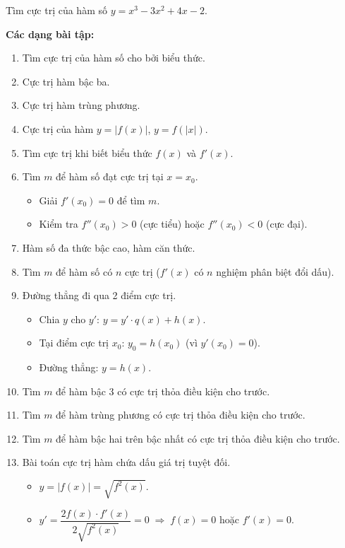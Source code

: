 \documentclass[12pt,a4paper]{article}
\begin{document}
\begin{vidu}
  Tìm cực trị của hàm số $y = x^3 - 3x^2 + 4x - 2$.
\end{vidu}

\medskip\noindent\textbf{Các dạng bài tập:}
\begin{enumerate}[label=\textbf{Dạng \arabic*:}, leftmargin=*, align=left]
  \item Tìm cực trị của hàm số cho bởi biểu thức.
  \item Cực trị hàm bậc ba.
  \item Cực trị hàm trùng phương.
  \item Cực trị của hàm $y = |f(x)|$, $y = f(|x|)$.
  \item Tìm cực trị khi biết biểu thức $f(x)$ và $f'(x)$.
  \item Tìm $m$ để hàm số đạt cực trị tại $x = x_0$.
    \begin{itemize}
      \item Giải $f'(x_0) = 0$ để tìm $m$.
      \item Kiểm tra $f''(x_0) > 0$ (cực tiểu) hoặc $f''(x_0) < 0$ (cực đại).
    \end{itemize}
  \item Hàm số đa thức bậc cao, hàm căn thức.
  \item Tìm $m$ để hàm số có $n$ cực trị ($f'(x)$ có $n$ nghiệm phân biệt đổi dấu).
  \item Đường thẳng đi qua 2 điểm cực trị.
    \begin{itemize}
      \item Chia $y$ cho $y'$: $y = y' \cdot q(x) + h(x)$.
      \item Tại điểm cực trị $x_0$: $y_0 = h(x_0)$ (vì $y'(x_0) = 0$).
      \item Đường thẳng: $y = h(x)$.
    \end{itemize}
  \item Tìm $m$ để hàm bậc 3 có cực trị thỏa điều kiện cho trước.
  \item Tìm $m$ để hàm trùng phương có cực trị thỏa điều kiện cho trước.
  \item Tìm $m$ để hàm bậc hai trên bậc nhất có cực trị thỏa điều kiện cho trước.
  \item Bài toán cực trị hàm chứa dấu giá trị tuyệt đối.
    \begin{itemize}
      \item $y = |f(x)| = \sqrt{f^2(x)}$.
      \item $y' = \dfrac{2f(x) \cdot f'(x)}{2\sqrt{f^2(x)}} = 0 \;\Rightarrow\; f(x) = 0$ hoặc $f'(x) = 0$.

\end{itemize}
\end{enumerate}
\end{document}
